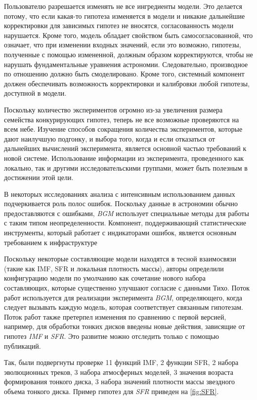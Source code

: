 Пользователю разрешается изменять не все ингредиенты модели. Это делается потому, что если какая-то гипотеза 
изменяется в модели и никакие дальнейшие корректировки для зависимых гипотез не вносятся, согласованность модели 
нарушается. Кроме того, модель обладает свойством быть самосогласованной, что означает, что при изменении входных 
значений, если это возможно, гипотезы, полученные с помощью измененной, должным образом корректируются, чтобы не 
нарушать фундаментальные уравнения астрономии. Следовательно, производное по отношению должно быть смоделировано. 
Кроме того, системный компонент должен обеспечивать возможность корректировки и калибровки любой гипотезы, 
доступной в модели.

Поскольку количество экспериментов огромно из-за увеличения размера семейства конкурирующих гипотез, теперь не все 
возможные проверяются на всем небе. Изучение способов сокращения количества экспериментов, которые дают наилучшую 
подгонку, и выбора того, когда и если отказаться от дальнейших вычислений эксперимента, является основной частью 
требований к новой системе. Использование информации из эксперимента, проведенного как локально, так и другими 
исследовательскими группами, может быть полезным в достижении этой цели.

В некоторых исследованиях анализа с интенсивным использованием данных подчеркивается роль полос ошибок. Поскольку 
данные в астрономии обычно предоставляются с ошибками, \textit{BGM} использует специальные методы для работы с 
таким типом неопределенности. Компонент, поддерживающий статистические инструменты, который работает с индикаторами 
ошибок, является основным требованием к инфраструктуре

Поскольку некоторые составляющие модели находятся в тесной взаимосвязи (такие как IMF, SFR и локальная плотность 
массы), авторы определили конфигурацию модели по умолчанию как сочетание нового набора составляющих, которые 
существенно улучшают согласие с данными Тихо. Поток работ используется для реализации эксперимента \textit{BGM}, 
определяющего, когда следует вызывать каждую модель, которая соответствует связанным гипотезам. Поток работ также 
претерпел изменения по сравнению с первой версией, например, для обработки тонких дисков введены новые действия, 
зависящие от гипотез \textit{IMF} и \textit{SFR}. Это развитие можно отследить только с помощью публикаций. 


Так, были подвергнуты проверке 11 функций IMF, 2 функции SFR, 2 набора эволюционных треков, 3 набора атмосферных 
моделей, 3 значения возраста формирования тонкого диска, 3 набора значений плотности массы звездного объема 
тонкого диска. Пример гипотез для \textit{SFR} приведен на \cref{fig:SFR}.

